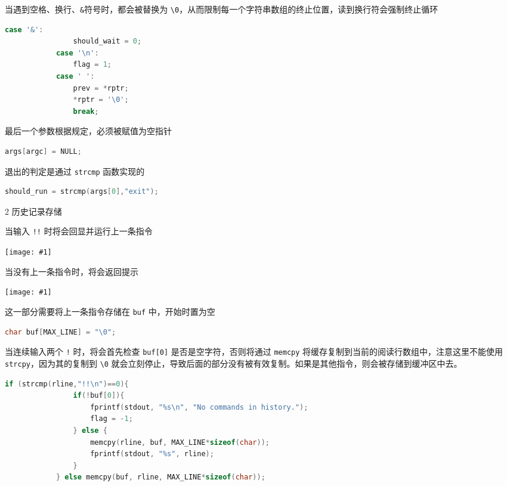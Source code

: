 \documentclass[12pt,a4paper]{article}
\newenvironment{problems}{\begin{list}{}{\renewcommand{\makelabel}[1]{\textbf{##1}\hfil}}}{\end{list}}
\newenvironment{steps}{\begin{list}{}{\renewcommand{\makelabel}[1]{##1.\hfil}}}{\end{list}}
\providecommand{\img}[1]{\texttt{[image: \#1]}}
\begin{document}
\begin{problems}
\begin{steps}
        

        当遇到空格、换行、\verb"&"符号时，都会被替换为 \verb"\0"，从而限制每一个字符串数组的终止位置，读到换行符会强制终止循环
        \begin{lstlisting}[language=c]
            case '&':
                should_wait = 0;
            case '\n':
                flag = 1;
            case ' ':
                prev = *rptr;
                *rptr = '\0';
                break;
        \end{lstlisting}

        最后一个参数根据规定，必须被赋值为空指针
        \begin{lstlisting}[language=c]
            args[argc] = NULL;
        \end{lstlisting}

        退出的判定是通过 \verb"strcmp" 函数实现的
        \begin{lstlisting}[language=c]
            should_run = strcmp(args[0],"exit");
        \end{lstlisting}

        \item[2] 历史记录存储
        
        当输入 \verb"!!" 时将会回显并运行上一条指令

        \img{history.png}

        当没有上一条指令时，将会返回提示

        \img{nohist.png}

        这一部分需要将上一条指令存储在 \texttt{buf} 中，开始时置为空
        \begin{lstlisting}[language=c]
            char buf[MAX_LINE] = "\0";
        \end{lstlisting}

        当连续输入两个 \verb"!" 时，将会首先检查 \verb"buf[0]" 是否是空字符，否则将通过 \verb"memcpy" 将缓存复制到当前的阅读行数组中，注意这里不能使用 \verb"strcpy"，因为其的复制到 \verb"\0" 就会立刻停止，导致后面的部分没有被有效复制。如果是其他指令，则会被存储到缓冲区中去。
        \begin{lstlisting}[language=c]
            if (strcmp(rline,"!!\n")==0){
                if(!buf[0]){
                    fprintf(stdout, "%s\n", "No commands in history.");
                    flag = -1;
                } else {
                    memcpy(rline, buf, MAX_LINE*sizeof(char));
                    fprintf(stdout, "%s", rline);
                }
            } else memcpy(buf, rline, MAX_LINE*sizeof(char));
        \end{lstlisting}


\end{steps}
\end{problems}
\end{document}
